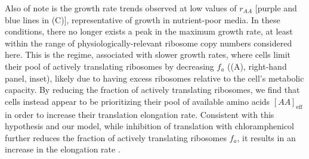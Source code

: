 Also of note is the growth rate trends observed at low values of $r_{AA}$
[purple and blue lines in (C)], representative of
growth in nutrient-poor media. In these conditions, there no longer exists a
peak in the maximum growth rate, at least within the range of
physiologically-relevant ribosome copy numbers considered here. This is the
regime, associated with slower growth rates, where cells limit their pool of
actively translating ribosomes by decreasing $f_a$ ((A),
right-hand panel, inset), likely due to having excess ribosomes relative to the
cell's metabolic capacity. By reducing the fraction of actively translating
ribosomes, we find that cells instead appear to be prioritizing their pool of
available amino acids $[AA]_\text{eff}$ in order to increase their translation
elongation rate. Consistent with this hypothesis and our model, while inhibition
of translation with chloramphenicol further reduces the fraction of actively
translating ribosomes $f_a$, it results in an increase in the elongation rate
\cite{dai2016}.

